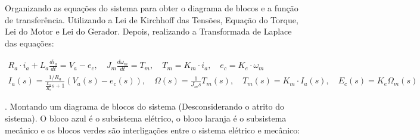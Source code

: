 \documentclass[10pt]{article}
\begin{document}
\quad Organizando as equações do sistema para obter o diagrama de blocos e a função de transferência.
Utilizando a Lei de Kirchhoff das Tensões, Equação do Torque, Lei do Motor e Lei do Gerador. Depois,
realizando a Transformada de Laplace das equações:

\begin{equation}
\begin{aligned}
    R_a \cdot i_a + L_a \frac{di_a}{dt} = V_a - e_c, \quad J_m \frac{d\omega_m}{dt} = T_m, \quad T_m = K_m \cdot i_a, \quad e_c = K_e \cdot \omega_m \\
    I_a(s) = \frac{1/R_a}{\frac{L_a}{R_a}s + 1}(V_a(s) - e_c(s)), \quad \Omega(s) = \frac{1}{J_m s }T_m(s), \quad T_m(s) = K_m \cdot I_a(s), \quad E_c(s) = K_e\Omega_m(s)
\end{aligned}
\end{equation}

. Montando um diagrama de blocos do sistema (Desconsiderando o atrito do sistema).
O bloco azul é o subsistema elétrico, o bloco laranja é o subsistema mecânico e os blocos verdes são interligações entre o sistema elétrico e mecânico:
\end{document}
